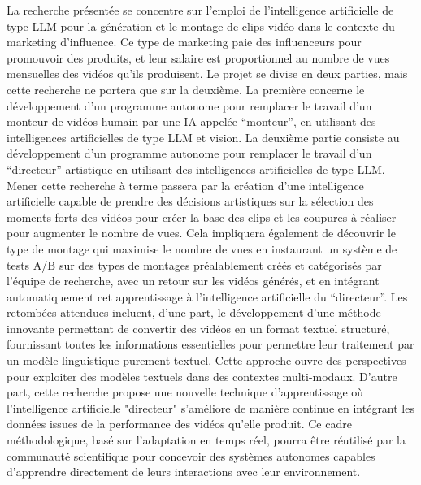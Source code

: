 La recherche présentée se concentre sur l'emploi de l'intelligence artificielle de type LLM pour la génération et le montage de clips vidéo dans le contexte du marketing d’influence. Ce type de marketing paie des influenceurs pour promouvoir des produits, et leur salaire est proportionnel au nombre de vues mensuelles des vidéos qu’ils produisent.
Le projet se divise en deux parties, mais cette recherche ne portera que sur la deuxième. La première concerne le développement d’un programme autonome pour remplacer le travail d'un monteur de vidéos humain par une IA appelée “monteur”, en utilisant des intelligences artificielles de type LLM et vision. La deuxième partie consiste au développement d’un programme autonome pour remplacer le travail d’un “directeur” artistique en utilisant des intelligences artificielles de type LLM.
Mener cette recherche à terme passera par la création d’une intelligence artificielle capable de prendre des décisions artistiques sur la sélection des moments forts des vidéos pour créer la base des clips et les coupures à réaliser pour augmenter le nombre de vues. Cela impliquera également de découvrir le type de montage qui maximise le nombre de vues en instaurant un système de tests A/B sur des types de montages préalablement créés et catégorisés par l’équipe de recherche, avec un retour sur les vidéos générés, et en intégrant automatiquement cet apprentissage à l’intelligence artificielle du “directeur”.
Les retombées attendues incluent, d'une part, le développement d'une méthode innovante permettant de convertir des vidéos en un format textuel structuré, fournissant toutes les informations essentielles pour permettre leur traitement par un modèle linguistique purement textuel. Cette approche ouvre des perspectives pour exploiter des modèles textuels dans des contextes multi-modaux.
D'autre part, cette recherche propose une nouvelle technique d’apprentissage où l’intelligence artificielle "directeur" s’améliore de manière continue en intégrant les données issues de la performance des vidéos qu’elle produit. Ce cadre méthodologique, basé sur l’adaptation en temps réel, pourra être réutilisé par la communauté scientifique pour concevoir des systèmes autonomes capables d’apprendre directement de leurs interactions avec leur environnement.
